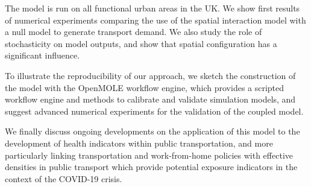 \documentclass[10pt]{article}
\begin{document}
The model is run on all functional urban areas in the UK. We show first results of numerical experiments comparing the use of the spatial interaction model with a null model to generate transport demand. We also study the role of stochasticity on model outputs, and show that spatial configuration has a significant influence.

To illustrate the reproducibility of our approach, we sketch the construction of the model with the OpenMOLE workflow engine, which provides a scripted workflow engine and methods to calibrate and validate simulation models, and suggest advanced numerical experiments for the validation of the coupled model.

We finally discuss ongoing developments on the application of this model to the development of health indicators within public transportation, and more particularly linking transportation and work-from-home policies with effective densities in public transport which provide potential exposure indicators in the context of the COVID-19 crisis.



	
\end{document}
